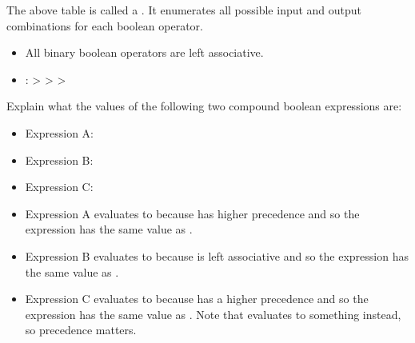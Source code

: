 \documentclass[letterpaper,10pt,english]{sphinxmanual}
\begin{document}
The above table is called a . It enumerates all possible input and output combinations for each boolean operator.

\begin{itemize}
\item {} 
All binary boolean operators are left associative.

\item {} 
:  >  >  > 

\end{itemize}

 Explain what the values of the following two compound boolean expressions are:
\begin{itemize}
\item {} 
Expression A: 

\item {} 
Expression B: 

\item {} 
Expression C: 

\end{itemize}
\begin{itemize}
\item {} 
Expression A evaluates to  because  has higher precedence and so the expression has the same value as .

\item {} 
Expression B evaluates to  because  is left associative and so the expression has the same value as .

\item {} 
Expression C evaluates to  because  has a higher precedence and so the expression has the same value as . Note that  evaluates to something  instead, so precedence matters.

\end{itemize}
\end{document}
